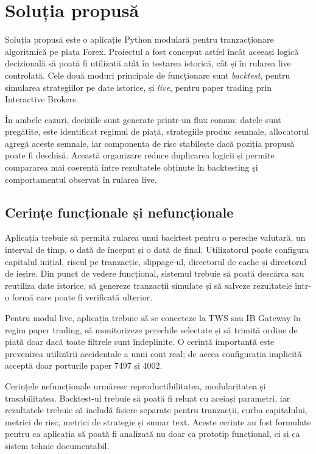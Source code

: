 \chapter{Soluția propusă}
\label{cap:cap3}

Soluția propusă este o aplicație Python modulară pentru tranzacționare algoritmică pe piața Forex. Proiectul a fost conceput astfel încât aceeași logică decizională să poată fi utilizată atât în testarea istorică, cât și în rularea live controlată. Cele două moduri principale de funcționare sunt \textit{backtest}, pentru simularea strategiilor pe date istorice, și \textit{live}, pentru paper trading prin Interactive Brokers.

În ambele cazuri, deciziile sunt generate printr-un flux comun: datele sunt pregătite, este identificat regimul de piață, strategiile produc semnale, allocatorul agregă aceste semnale, iar componenta de risc stabilește dacă poziția propusă poate fi deschisă. Această organizare reduce duplicarea logicii și permite compararea mai coerentă între rezultatele obținute în backtesting și comportamentul observat în rularea live.

\section{Cerințe funcționale și nefuncționale}
\label{cap:cap3:cerinte}

Aplicația trebuie să permită rularea unui backtest pentru o pereche valutară, un interval de timp, o dată de început și o dată de final. Utilizatorul poate configura capitalul inițial, riscul pe tranzacție, slippage-ul, directorul de cache și directorul de ieșire. Din punct de vedere funcțional, sistemul trebuie să poată descărca sau reutiliza date istorice, să genereze tranzacții simulate și să salveze rezultatele într-o formă care poate fi verificată ulterior.

Pentru modul live, aplicația trebuie să se conecteze la TWS sau IB Gateway în regim paper trading, să monitorizeze perechile selectate și să trimită ordine de piață doar dacă toate filtrele sunt îndeplinite. O cerință importantă este prevenirea utilizării accidentale a unui cont real; de aceea configurația implicită acceptă doar porturile paper 7497 și 4002.

Cerințele nefuncționale urmăresc reproductibilitatea, modularitatea și trasabilitatea. Backtest-ul trebuie să poată fi reluat cu aceiași parametri, iar rezultatele trebuie să includă fișiere separate pentru tranzacții, curba capitalului, metrici de risc, metrici de strategie și sumar text. Aceste cerințe au fost formulate pentru ca aplicația să poată fi analizată nu doar ca prototip funcțional, ci și ca sistem tehnic documentabil.

